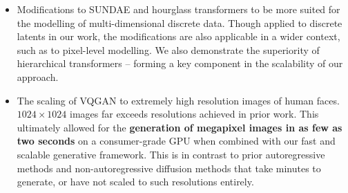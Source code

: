 \documentclass[14pt,margin=0.5in,innermargin=0in,blockverticalspace=-0.1in,colspace=-1.0cm]{tikzposter}
\begin{document}
\begin{columns}
{\begin{tcolorbox}[boxsep=0pt,top=0cm,adjusted title={\Large Proposed Method},colbacktitle=colorOne]
\begin{itemize}
            \item
                Modifications to SUNDAE and hourglass transformers to be more
                suited for the modelling of multi-dimensional discrete data. Though
                applied to discrete latents in our work, the modifications are
                also applicable in a wider context, such as to pixel-level
                modelling. We also demonstrate the superiority of hierarchical
                transformers -- forming a key component in the scalability of
                our approach. 
            \item
                The scaling of VQGAN to extremely high resolution images of
                human faces. $1024 \times 1024$ images far exceeds resolutions
                achieved in prior work. This ultimately allowed for the
                \textbf{generation of megapixel images in as few as two seconds}
                on a consumer-grade GPU when combined with our fast and scalable
                generative framework. This is in contrast to prior
                autoregressive methods and non-autoregressive diffusion methods
                that take minutes to generate, or have not scaled to such
                resolutions entirely.

        \end{itemize}
        \end{tcolorbox}
    }


\end{columns}
\end{document}
